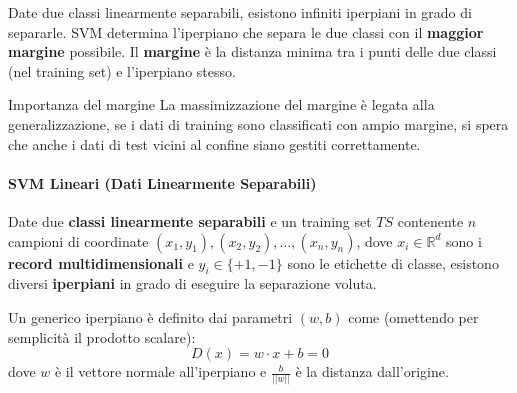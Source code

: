 Date due classi linearmente separabili, esistono infiniti iperpiani in grado
di separarle.
SVM determina l'iperpiano che separa le due classi con il
\textbf{maggior margine} possibile.
Il \textbf{margine} è la distanza minima tra i punti delle due classi
(nel training set) e l'iperpiano stesso.

\begin{nota}{Importanza del margine}{}
La massimizzazione del margine è legata alla generalizzazione, se i dati di
training sono classificati con ampio margine, si spera che anche i dati di
test vicini al confine siano gestiti correttamente.
\end{nota}

\paragraph{SVM Lineari (Dati Linearmente Separabili)}

Date due \textbf{classi linearmente separabili} e un training set $TS$
contenente $n$ campioni di coordinate $(x_1, y_1), (x_2, y_2), \ldots, (x_n, y_n)$,
dove $x_i \in \mathbb{R}^d$ sono i \textbf{record multidimensionali} e
$y_i \in \{+1, -1\}$ sono le etichette di classe, esistono diversi
\textbf{iperpiani} in grado di eseguire la separazione voluta.


Un generico iperpiano è definito dai parametri $(w, b)$ come (omettendo per
semplicità il prodotto scalare):
\[
D(x) = w \cdot x + b = 0
\]
dove $w$ è il vettore normale all'iperpiano e $\frac{b}{||w||}$ è la distanza
dall'origine.